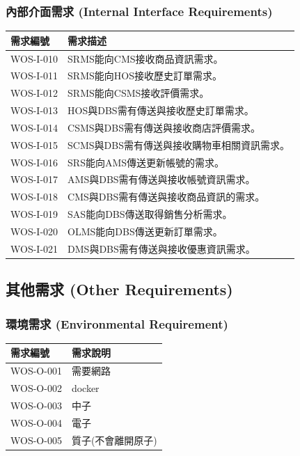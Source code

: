 \documentclass[a4paper, 12pt]{article}
\begin{document}
\subsubsection{內部介面需求 (Internal Interface Requirements)}
\begin{center}
    \begin{tabular}{ | p{6.5em} | p{32em} |}
    \hline
    需求編號 & 需求描述 \\ 
    \hline
    WOS-I-010 & SRMS能向CMS接收商品資訊需求。\\
    \hline
    WOS-I-011 & SRMS能向HOS接收歷史訂單需求。\\
    \hline
    WOS-I-012 & SRMS能向CSMS接收評價需求。\\
    \hline
    WOS-I-013 & HOS與DBS需有傳送與接收歷史訂單需求。\\
    \hline
    WOS-I-014 & CSMS與DBS需有傳送與接收商店評價需求。\\
    \hline
    WOS-I-015 & SCMS與DBS需有傳送與接收購物車相關資訊需求。\\
    \hline
    WOS-I-016 & SRS能向AMS傳送更新帳號的需求。\\
    \hline
    WOS-I-017 & AMS與DBS需有傳送與接收帳號資訊需求。\\
    \hline
    WOS-I-018 & CMS與DBS需有傳送與接收商品資訊的需求。\\
    \hline
    WOS-I-019 & SAS能向DBS傳送取得銷售分析需求。\\
    \hline
    WOS-I-020 & OLMS能向DBS傳送更新訂單需求。\\
    \hline
    WOS-I-021 & DMS與DBS需有傳送與接收優惠資訊需求。\\
    \hline
    \end{tabular}
\end{center}
\subsection{其他需求 (Other Requirements)}
\subsubsection{環境需求 (Environmental Requirement)}
\begin{center}
    \begin{tabular}{ | p{6.5em} | p{32em} |}
    \hline
    需求編號 & 需求說明 \\ 
    \hline
    WOS-O-001 & 需要網路\\ 
    \hline
    WOS-O-002 & docker\\ 
    \hline
    WOS-O-003 & 中子\\ 
    \hline
    WOS-O-004 & 電子\\ 
    \hline
    WOS-O-005 & 質子(不會離開原子)\\ 
    \hline
    \end{tabular}
\end{center}
\end{document}
